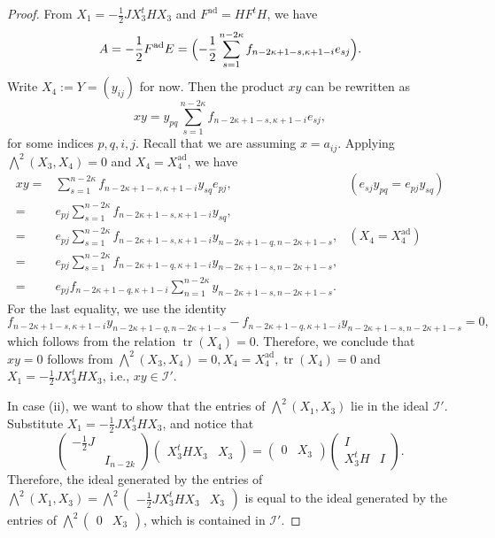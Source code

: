 \documentclass[pdflatex,sn-mathphys-num]{sn-jnl}%
\theoremstyle{thmstyleone}%
\theoremstyle{thmstyletwo}%
\numberwithin{equation}{subsection}
\theoremstyle{thmstylethree}%
\newcommand{\CI}{\ensuremath{\mathcal{I}}\xspace}
\newcommand{\ad}{\mathrm{ad}}
\DeclareMathOperator{\tr}{tr}
\begin{document}
\begin{proof}
From $X_1=-\frac{1}{2}JX_3^tHX_3$ and $F^{\ad}=HF^tH$, we have
\[
A=-\frac{1}{2}F^{\ad}E=\Bigl(-\frac{1}{2}\sum_{s=1}^{n-2\kappa} f_{n-2\kappa+1-s,\kappa+1-i}e_{sj}\Bigr).
\]
Write $X_4:=Y=(y_{ij})$ for now. Then the product $xy$ can be rewritten as
\[
xy=y_{pq}\sum_{s=1}^{n-2\kappa}f_{n-2\kappa+1-s,\kappa+1-i}e_{sj},
\]
for some indices $p, q, i, j$. Recall that we are assuming $x=a_{ij}$.
Applying $\bigwedge^2(X_3,X_4)=0$ and $X_4=X_4^{\ad}$, we have
\begin{align*}
	xy={}&\sum_{s=1}^{n-2\kappa}f_{n-2\kappa+1-s,\kappa+1-i}y_{sq}e_{pj},&(e_{sj}y_{pq}=e_{pj}y_{sq})\\
	={}&e_{pj}\sum_{s=1}^{n-2\kappa}f_{n-2\kappa+1-s,\kappa+1-i}y_{sq},&\\
	={}&e_{pj}\sum_{s=1}^{n-2\kappa}f_{n-2\kappa+1-s,\kappa+1-i}y_{n-2\kappa+1-q,n-2\kappa+1-s},&(X_4=X_4^{\ad})\\
	={}&e_{pj}\sum_{s=1}^{n-2\kappa}f_{n-2\kappa+1-q,\kappa+1-i}y_{n-2\kappa+1-s,n-2\kappa+1-s},&\\
	={}&e_{pj}f_{n-2\kappa+1-q,\kappa+1-i}\sum_{n=1}^{n-2\kappa}y_{n-2\kappa+1-s,n-2\kappa+1-s}.
\end{align*}
For the last equality, we use the identity
\[
	f_{n-2\kappa+1-s,\kappa+1-i}y_{n-2\kappa+1-q,n-2\kappa+1-s}-f_{n-2\kappa+1-q,\kappa+1-i}y_{n-2\kappa+1-s,n-2\kappa+1-s}=0,
\]
which follows from the relation $\tr(X_4)=0$. 
Therefore, we conclude that $xy=0$ follows from $\bigwedge^2(X_3,X_4)=0,X_4=X_4^{\ad}, \tr(X_4)=0$ and $X_1=-\frac{1}{2}JX_3^t HX_3$, i.e., $xy\in\CI'$.
			
			

In case (ii), we want to show that the entries of $\bigwedge^2(X_1, X_3)$ lie in the ideal $\CI'$. 
Substitute $X_1=-\frac{1}{2}JX_3^t HX_3$, and notice that
\begin{equation*}
	\left(\begin{matrix} -\frac{1}{2}J&\\&I_{n-2k}\end{matrix}\right)\left(\begin{matrix} X_3^tH X_3&X_3\end{matrix}\right)=\left(\begin{matrix}0&X_3\end{matrix}\right)\left(\begin{matrix} I&\\X_3^tH&I\end{matrix}\right).
\end{equation*}
Therefore, the ideal generated by the entries of $\bigwedge^2(X_1,X_3)=\bigwedge^2\left(\begin{matrix}-\frac{1}{2}JX_3^tHX_3	&	X_3\end{matrix}\right)$ is equal to the ideal generated by the entries of $\bigwedge^2\left(\begin{matrix}0&X_3\end{matrix}\right)$, which is contained in $\CI'$.
\end{proof}
\end{document}
